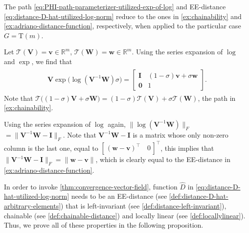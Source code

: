 \begin{remark}
    The path \eqref{eq:PHI-path-parameterizer-utilized-exp-of-log} and EE-distance \eqref{eq:distance-D-hat-utilized-log-norm} reduce to the ones in \cref{ex:chainability} and \cref{ex:adriano-distance-function}, respectively, when applied to the particular case $G=\text{T}(m)$.

    Let $\mathcal{T}(\mathbf{V}) = \mathbf{v}\in\mathbb{R}^m$, $\mathcal{T}(\mathbf{W}) = \mathbf{w}\in\mathbb{R}^m$. Using the series expansion of $\log$ and $\exp$, we find that
    \begin{align}
    \begin{split}
        \mathbf{V}\exp{\bigl(\log{(\mathbf{V}^{-1}\mathbf{W})}\sigma\bigr)} 
        = \begin{bmatrix}
            \mathbf{I} & (1 - \sigma)\mathbf{v} + \sigma \mathbf{w}\\ \mathbf{0} & 1
        \end{bmatrix}.
        \end{split}
    \end{align}
    Note that $\mathcal{T}\bigl((1 - \sigma)\mathbf{V} + \sigma\mathbf{W}\bigr) = (1 - \sigma)\mathcal{T}(\mathbf{V}) + \sigma \mathcal{T}(\mathbf{W})$, the path in \cref{ex:chainability}.

    Using the series expansion of $\log$ again, $\|\log{(\mathbf{V}^{-1}\mathbf{W})}\|_F$
    $= \|\mathbf{V}^{-1}\mathbf{W} - \mathbf{I}\|_F$. Note that $\mathbf{V}^{-1}\mathbf{W} - \mathbf{I}$ is a matrix whose only non-zero column is the last one, equal to $[\,(\mathbf{w} - \mathbf{v})^\top\quad 0\,]^\top$, this implies that $\|\mathbf{V}^{-1}\mathbf{W} - \mathbf{I}\|_F$$=\|\mathbf{w}-\mathbf{v}\|$, which is clearly equal to the EE-distance in \cref{ex:adriano-distance-function}. 
\end{remark}

In order to invoke \cref{thm:convergence-vector-field}, function $\widehat{D}$ in \eqref{eq:distance-D-hat-utilized-log-norm} needs to be an EE-distance (see \cref{def:distance-D-hat-arbitrary-elements}) that is left-invariant (see \cref{def:distance-left-invariant}), chainable (see \cref{def:chainable-distance}) and locally linear (see \cref{def:locallylinear}). Thus, we prove all of these properties in the following proposition.

